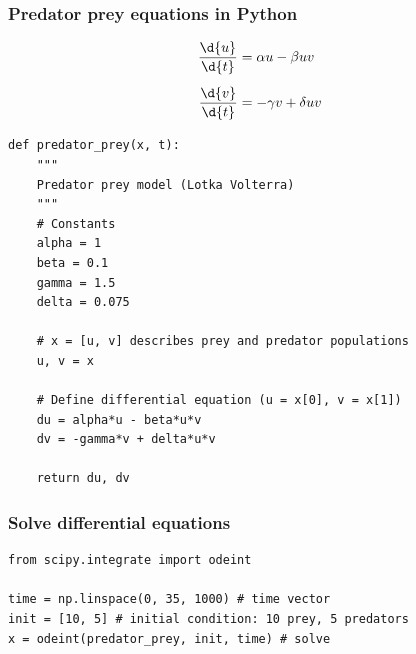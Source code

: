 \documentclass[xcolor=table]{beamer}
\begin{document}
\begin{frame}[fragile]
\frametitle{Predator prey equations in Python}

\vspace{-0.4cm}
\scriptsize
\begin{align*}
 \frac{\d{u}}{\d{t}} &= \alpha u - \beta uv\\[0.5em]
\frac{\d{v}}{\d{t}} &= -\gamma v + \delta uv 
\end{align*}
\normalsize


\begin{lstlisting}[style=python]
def predator_prey(x, t):
    """
	Predator prey model (Lotka Volterra)
    """
    # Constants
    alpha = 1
    beta = 0.1
    gamma = 1.5
    delta = 0.075
    
    # x = [u, v] describes prey and predator populations
    u, v = x
    
    # Define differential equation (u = x[0], v = x[1])
    du = alpha*u - beta*u*v
    dv = -gamma*v + delta*u*v
    
    return du, dv
\end{lstlisting}

\end{frame}

\begin{frame}[fragile]
\frametitle{Solve differential equations}

\begin{lstlisting}[style=python] 
from scipy.integrate import odeint

time = np.linspace(0, 35, 1000) # time vector
init = [10, 5] # initial condition: 10 prey, 5 predators
x = odeint(predator_prey, init, time) # solve
\end{lstlisting}

\vspace{-.8cm}


\end{frame}
\end{document}
